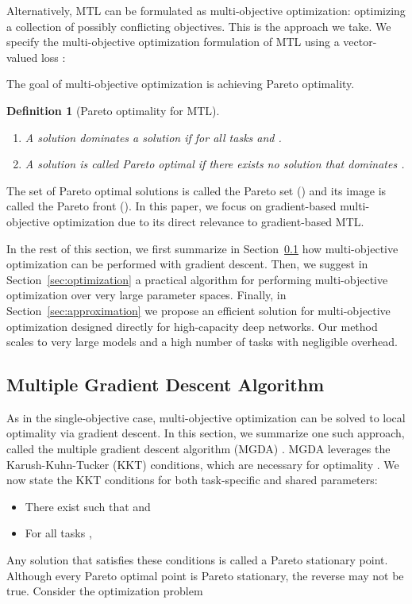 \documentclass{article}
\newtheorem{definition}{Definition}
\begin{document}
Alternatively, MTL can be formulated as multi-objective optimization: optimizing a collection of possibly conflicting objectives. This is the approach we take. We specify the multi-objective optimization formulation of MTL using a vector-valued loss :


The goal of multi-objective optimization is achieving Pareto optimality.


\begin{definition}[Pareto optimality for MTL] {\ }\begin{enumerate}[ topsep=0pt, label=\emph{(\alph*)},align=left,leftmargin=*]
\item A solution  dominates a solution  if \mbox{} for all tasks  and \mbox{}.
\item A solution  is called Pareto optimal if there exists no solution  that dominates .
\end{enumerate}
\end{definition}

The set of Pareto optimal solutions is called the Pareto set () and its image is called the Pareto front (). In this paper, we focus on gradient-based multi-objective optimization due to its direct relevance to gradient-based MTL.

In the rest of this section, we first summarize in Section~\ref{sec:mgda} how multi-objective optimization can be performed with gradient descent. Then, we suggest in Section~\ref{sec:optimization} a practical algorithm for performing multi-objective optimization over very large parameter spaces. Finally, in Section~\ref{sec:approximation} we propose an efficient solution for multi-objective optimization designed directly for high-capacity deep networks. Our method scales to very large models and a high number of tasks with negligible overhead.


\subsection{Multiple Gradient Descent Algorithm}
\label{sec:mgda}

As in the single-objective case, multi-objective optimization can be solved to local optimality via gradient descent. In this section, we summarize one such approach, called the multiple gradient descent algorithm (MGDA) \citep{Desideri2012}. MGDA leverages the Karush-Kuhn-Tucker (KKT) conditions, which are necessary for optimality \citep{Fliege2000,Schaffler2002,Desideri2012}. We now state the KKT conditions for both task-specific and shared parameters:
\begin{itemize}[itemsep=0pt,topsep=0pt]
\item There exist  such that  and 
\item For all tasks ,  
\end{itemize}
Any solution that satisfies these conditions is called a Pareto stationary point. Although every Pareto optimal point is Pareto stationary, the reverse may not be true. Consider the optimization problem
\end{document}
